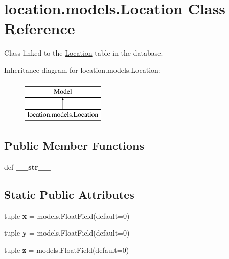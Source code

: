 \hypertarget{classlocation_1_1models_1_1Location}{\section{location.\-models.\-Location Class Reference}
\label{classlocation_1_1models_1_1Location}
}


Class linked to the \hyperlink{classlocation_1_1models_1_1Location}{Location} table in the database.  


Inheritance diagram for location.\-models.\-Location\-:\begin{figure}[H]
\begin{center}
\leavevmode
\includegraphics[height=2.000000cm]{classlocation_1_1models_1_1Location}
\end{center}
\end{figure}
\subsection*{Public Member Functions}
\begin{DoxyCompactItemize}
\item 
\hypertarget{classlocation_1_1models_1_1Location_a4ec1d4870386917e6653b7c54d43605e}{def {\bfseries \-\_\-\-\_\-str\-\_\-\-\_\-}}\label{classlocation_1_1models_1_1Location_a4ec1d4870386917e6653b7c54d43605e}

\end{DoxyCompactItemize}
\subsection*{Static Public Attributes}
\begin{DoxyCompactItemize}
\item 
\hypertarget{classlocation_1_1models_1_1Location_a762901546b3ee3d286a82610e54477fc}{tuple {\bfseries x} = models.\-Float\-Field(default=0)}\label{classlocation_1_1models_1_1Location_a762901546b3ee3d286a82610e54477fc}

\item 
\hypertarget{classlocation_1_1models_1_1Location_a0076656a7475178556120670536e449a}{tuple {\bfseries y} = models.\-Float\-Field(default=0)}\label{classlocation_1_1models_1_1Location_a0076656a7475178556120670536e449a}

\item 
\hypertarget{classlocation_1_1models_1_1Location_a33b4be7eef0bcaacc8bcdb3c1d934074}{tuple {\bfseries z} = models.\-Float\-Field(default=0)}\label{classlocation_1_1models_1_1Location_a33b4be7eef0bcaacc8bcdb3c1d934074}

\end{DoxyCompactItemize}



